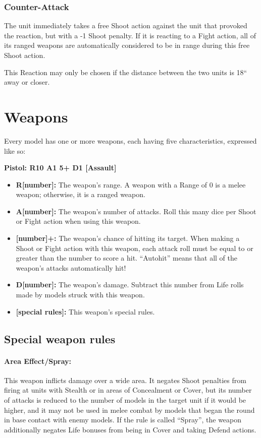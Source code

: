 \begin{multicols}{2}
\subsection*{Counter-Attack}
The unit immediately takes a free Shoot action against the unit that provoked the reaction, but with a -1 Shoot penalty. If it is reacting to a Fight action, all of its ranged weapons are automatically considered to be in range during this free Shoot action.

This Reaction may only be chosen if the distance between the two units is 18`` away or closer.




\chapter*{Weapons}

Every model has one or more weapons, each having five characteristics, expressed like so:

\textbf{Pistol: R10 A1 5+ D1 [Assault]}

\begin{itemize}
    \item \textbf{R[number]:} The weapon's range. A weapon with a Range of 0 is a melee weapon; otherwise, it is a ranged weapon.
    \item \textbf{A[number]:} The weapon's number of attacks. Roll this many dice per Shoot or Fight action when using this weapon.
    \item \textbf{[number]+:} The weapon's chance of hitting its target. When making a Shoot or Fight action with this weapon, each attack roll must be equal to or greater than the number to score a hit. ``Autohit'' means that all of the weapon's attacks automatically hit!
    \item \textbf{D[number]:} The weapon's damage. Subtract this number from Life rolls made by models struck with this weapon.
    \item \textbf{[special rules]:} This weapon's special rules.
\end{itemize}




\section*{Special weapon rules}

\subsubsection*{Area Effect/Spray:} This weapon inflicts damage over a wide area. It negates Shoot penalties from firing at units with Stealth or in areas of Concealment or Cover, but its number of attacks is reduced to the number of models in the target unit if it would be higher, and it may not be used in melee combat by models that began the round in base contact with enemy models. If the rule is called ``Spray'', the weapon additionally negates Life bonuses from being in Cover and taking Defend actions.


\end{multicols}
